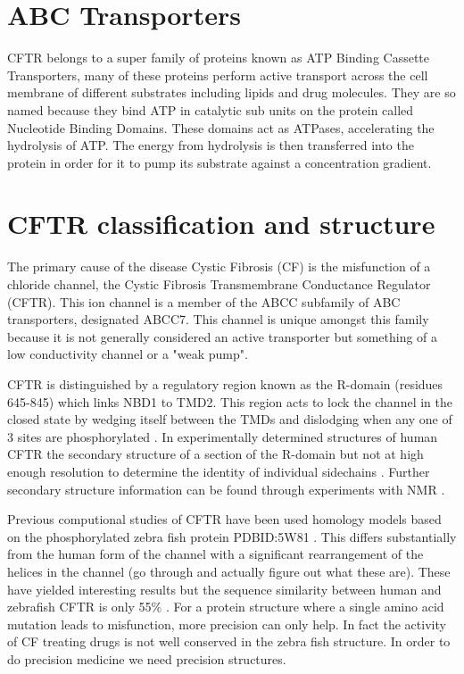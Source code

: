 \section{ABC Transporters}
CFTR belongs to a super family of proteins known as ATP Binding Cassette Transporters,  many of these proteins perform active transport across the cell membrane of different substrates including lipids and drug molecules. They are so named because they bind ATP in catalytic sub units on the protein called Nucleotide Binding Domains. These domains act as ATPases, accelerating the hydrolysis of ATP. The energy from hydrolysis is then transferred into the protein in order for it to pump its substrate against a concentration gradient. 

\section{CFTR classification and structure}

The primary cause of the disease Cystic Fibrosis (CF) is the misfunction of a chloride channel, the Cystic Fibrosis Transmembrane Conductance Regulator (CFTR). This ion channel is a member of the ABCC subfamily of ABC transporters, designated ABCC7. This channel is unique amongst this family because it is not generally considered an active transporter but something of a low conductivity channel or a "weak pump"\cite{Linsdell2018}.

CFTR is distinguished by a regulatory region known as the R-domain (residues 645-845) which links NBD1 to TMD2. This region acts to lock the channel in the closed state by wedging itself between the TMDs and dislodging when any one of 3 sites are phosphorylated \cite{Mihalyi2020}. In experimentally determined structures of human CFTR the secondary structure of a section of the R-domain but not at high enough resolution to determine the identity of individual sidechains \cite{Zhang2018}\cite{Zhang2016}. Further secondary structure information can be found through experiments with NMR \cite{Baker2007}.

Previous computional studies of CFTR have been used homology models based on the phosphorylated zebra fish protein PDBID:5W81 \cite{Zhang2017}. This differs substantially from the human form of the channel with a significant rearrangement of the helices in the channel (go through and actually figure out what these are). These have yielded interesting results but the sequence similarity between human and zebrafish CFTR is only 55\% \cite{}. For a protein structure where a single amino acid mutation leads to misfunction, more precision can only help. In fact the activity of CF treating drugs is not well conserved in the zebra fish structure. In order to do precision medicine we need precision structures. 

